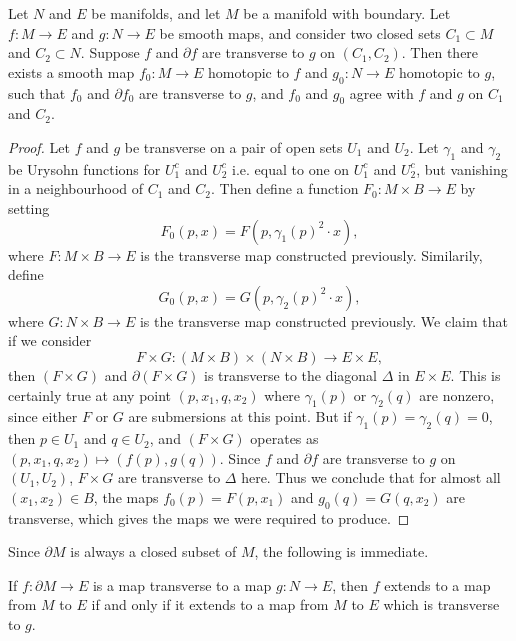\begin{theorem}
    Let $N$ and $E$ be manifolds, and let $M$ be a manifold with boundary. Let $f: M \to E$  and $g: N \to E$ be smooth maps, and consider two closed sets $C_1 \subset M$ and $C_2 \subset N$. Suppose $f$ and $\partial f$ are transverse to $g$ on $(C_1,C_2)$. Then there exists a smooth map $f_0: M \to E$ homotopic to $f$ and $g_0: N \to E$ homotopic to $g$, such that $f_0$ and $\partial f_0$ are transverse to $g$, and $f_0$ and $g_0$ agree with $f$ and $g$ on $C_1$ and $C_2$.
\end{theorem}
\begin{proof}
    Let $f$ and $g$ be transverse on a pair of open sets $U_1$ and $U_2$. Let $\gamma_1$ and $\gamma_2$ be Urysohn functions for $U_1^c$ and $U_2^c$ i.e. equal to one on $U_1^c$ and $U_2^c$, but vanishing in a neighbourhood of $C_1$ and $C_2$. Then define a function $F_0: M \times B \to E$ by setting
    \[ F_0(p,x) = F(p,\gamma_1(p)^2 \cdot x), \]
    where $F: M \times B \to E$ is the transverse map constructed previously. Similarily, define
    \[ G_0(p,x) = G(p,\gamma_2(p)^2 \cdot x), \]
    where $G: N \times B \to E$ is the transverse map constructed previously. We claim that if we consider
    \[ F \times G: (M \times B) \times (N \times B) \to E \times E, \]
    then $(F \times G)$ and $\partial (F \times G)$ is transverse to the diagonal $\Delta$ in $E \times E$. This is certainly true at any point $(p,x_1,q,x_2)$ where $\gamma_1(p)$ or $\gamma_2(q)$ are nonzero, since either $F$ or $G$ are submersions at this point. But if $\gamma_1(p) = \gamma_2(q) = 0$, then $p \in U_1$ and $q \in U_2$, and $(F \times G)$ operates as $(p,x_1,q,x_2) \mapsto (f(p),g(q))$. Since $f$ and $\partial f$ are transverse to $g$ on $(U_1,U_2)$, $F \times G$ are transverse to $\Delta$ here. Thus we conclude that for almost all $(x_1, x_2) \in B$, the maps $f_0(p) = F(p,x_1)$ and $g_0(q) = G(q,x_2)$ are transverse, which gives the maps we were required to produce.
\end{proof}

Since $\partial M$ is always a closed subset of $M$, the following is immediate.

\begin{corollary}
    If $f: \partial M \to E$ is a map transverse to a map $g: N \to E$, then $f$ extends to a map from $M$ to $E$ if and only if it extends to a map from $M$ to $E$ which is transverse to $g$.
\end{corollary}

